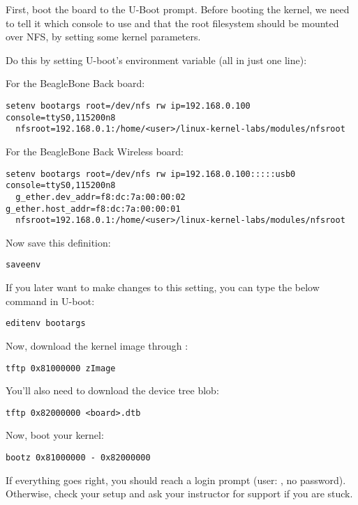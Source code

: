 First, boot the board to the U-Boot prompt. Before booting the kernel,
we need to tell it which console to use and that the root filesystem
should be mounted over NFS, by setting some kernel parameters.

Do this by setting U-boot's  environment variable (all in
just one line):

For the BeagleBone Back board:
\begin{verbatim}
setenv bootargs root=/dev/nfs rw ip=192.168.0.100 console=ttyS0,115200n8
  nfsroot=192.168.0.1:/home/<user>/linux-kernel-labs/modules/nfsroot
\end{verbatim}

For the BeagleBone Back Wireless board:
\begin{verbatim}
setenv bootargs root=/dev/nfs rw ip=192.168.0.100:::::usb0 console=ttyS0,115200n8
  g_ether.dev_addr=f8:dc:7a:00:00:02 g_ether.host_addr=f8:dc:7a:00:00:01
  nfsroot=192.168.0.1:/home/<user>/linux-kernel-labs/modules/nfsroot
\end{verbatim}

Now save this definition:
\begin{verbatim}
saveenv
\end{verbatim}

If you later want to make changes to this setting, you can type the
below command in U-boot:

\begin{verbatim}
editenv bootargs
\end{verbatim}

Now, download the kernel image through :

\begin{verbatim}
tftp 0x81000000 zImage
\end{verbatim}

You'll also need to download the device tree blob:

\begin{verbatim}
tftp 0x82000000 <board>.dtb
\end{verbatim}

Now, boot your kernel:

\begin{verbatim}
bootz 0x81000000 - 0x82000000
\end{verbatim}

If everything goes right, you should reach a login prompt (user:
, no password). Otherwise, check your setup and
ask your instructor for support if you are stuck.

